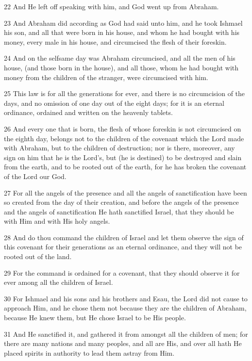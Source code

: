 \par 22 And He left off speaking with him, and God went up from Abraham.
\par 23 And Abraham did according as God had said unto him, and he took Ishmael his son, and all that were born in his house, and whom he had bought with his money, every male in his house, and circumcised the flesh of their foreskin.
\par 24 And on the selfsame day was Abraham circumcised, and all the men of his house, (and those born in the house), and all those, whom he had bought with money from the children of the stranger, were circumcised with him.
\par 25 This law is for all the generations for ever, and there is no circumcision of the days, and no omission of one day out of the eight days; for it is an eternal ordinance, ordained and written on the heavenly tablets.
\par 26 And every one that is born, the flesh of whose foreskin is not circumcised on the eighth day, belongs not to the children of the covenant which the Lord made with Abraham, but to the children of destruction; nor is there, moreover, any sign on him that he is the Lord's, but (he is destined) to be destroyed and slain from the earth, and to be rooted out of the earth, for he has broken the covenant of the Lord our God.
\par 27 For all the angels of the presence and all the angels of sanctification have been so created from the day of their creation, and before the angels of the presence and the angels of sanctification He hath sanctified Israel, that they should be with Him and with His holy angels.
\par 28 And do thou command the children of Israel and let them observe the sign of this covenant for their generations as an eternal ordinance, and they will not be rooted out of the land.
\par 29 For the command is ordained for a covenant, that they should observe it for ever among all the children of Israel.
\par 30 For Ishmael and his sons and his brothers and Esau, the Lord did not cause to approach Him, and he chose them not because they are the children of Abraham, because He knew them, but He chose Israel to be His people.
\par 31 And He sanctified it, and gathered it from amongst all the children of men; for there are many nations and many peoples, and all are His, and over all hath He placed spirits in authority to lead them astray from Him.
